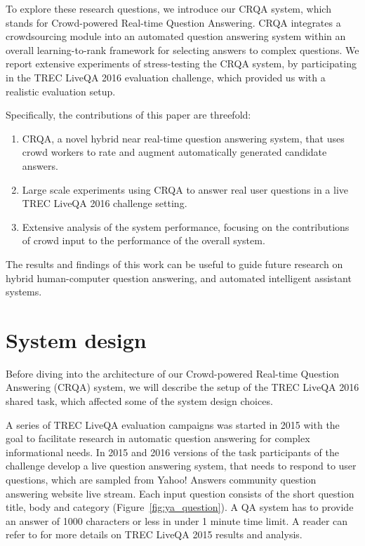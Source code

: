 \documentclass[letterpaper]{article}
\begin{document}
To explore these research questions, we introduce our CRQA system, which stands for Crowd-powered Real-time Question Answering.
CRQA integrates a crowdsourcing module into an automated question answering system within an overall learning-to-rank framework for selecting answers to complex questions.
We report extensive experiments of stress-testing the CRQA system, by participating in the TREC LiveQA 2016 evaluation challenge, which provided us with a realistic evaluation setup.

Specifically, the contributions of this paper are threefold:
\begin{enumerate}
	\item CRQA, a novel hybrid near real-time question answering system, that uses crowd workers to rate and augment automatically generated candidate answers.
	\item Large scale experiments using CRQA to answer real user questions in a live TREC LiveQA 2016 challenge setting.
	\item Extensive analysis of the system performance, focusing on the contributions of crowd input to the performance of the overall system.
\end{enumerate}

The results and findings of this work can be useful to guide future research on hybrid human-computer question answering, and automated intelligent assistant systems.

\section{System design}
\label{sec:system}

Before diving into the architecture of our Crowd-powered Real-time Question Answering (CRQA) system, we will describe the setup of the TREC LiveQA 2016 shared task, which affected some of the system design choices.

A series of TREC LiveQA evaluation campaigns was started in 2015 with the goal to facilitate research in automatic question answering for complex informational needs.
In 2015 and 2016 versions of the task participants of the challenge develop a live question answering system, that needs to respond to user questions, which are sampled from Yahoo! Answers community question answering website live stream.
Each input question consists of the short question title, body and category (Figure~\ref{fig:ya_question}).
A QA system has to provide an answer of 1000 characters or less in under 1 minute time limit.
A reader can refer to \cite{agichtein2015overview} for more details on TREC LiveQA 2015 results and analysis.
\end{document}
